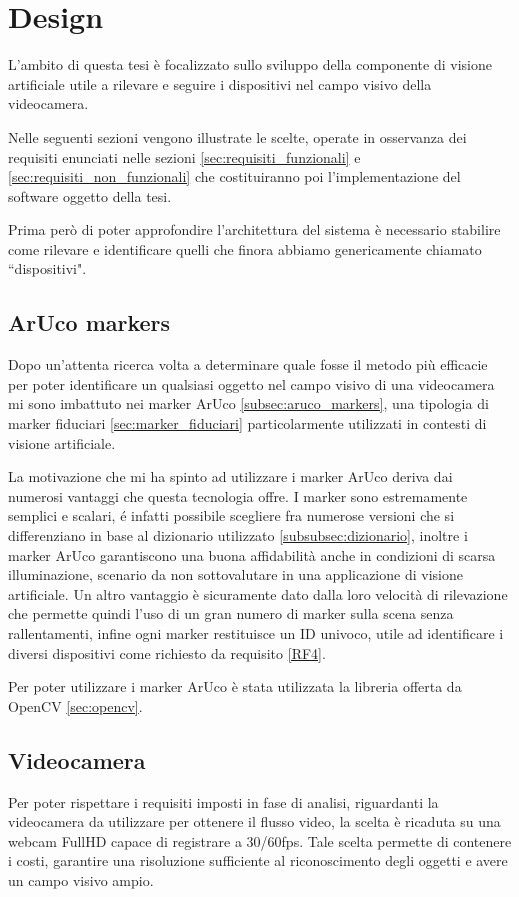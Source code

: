 \documentclass[12pt,a4paper,openright,twoside]{book}
\begin{document}
\chapter{Design}
L'ambito di questa tesi è focalizzato sullo sviluppo della componente di visione artificiale utile a rilevare e seguire i dispositivi nel campo visivo della videocamera.

Nelle seguenti sezioni vengono illustrate le scelte, operate in osservanza dei requisiti enunciati nelle sezioni \ref{sec:requisiti_funzionali} e \ref{sec:requisiti_non_funzionali} che costituiranno poi l'implementazione del software oggetto della tesi.

Prima però di poter approfondire l'architettura del sistema è necessario stabilire come rilevare e identificare quelli che finora abbiamo genericamente chiamato ``dispositivi".

\section{ArUco markers}
Dopo un'attenta ricerca volta a determinare quale fosse il metodo più efficacie per poter identificare un qualsiasi oggetto nel campo visivo di una videocamera mi sono imbattuto nei marker ArUco \ref{subsec:aruco_markers}, una tipologia di marker fiduciari \ref{sec:marker_fiduciari} particolarmente utilizzati in contesti di visione artificiale.

La motivazione che mi ha spinto ad utilizzare i marker ArUco deriva dai numerosi vantaggi che questa tecnologia offre.
I marker sono estremamente semplici e scalari, é infatti possibile scegliere fra numerose versioni che si differenziano in base al dizionario utilizzato \ref{subsubsec:dizionario}, inoltre i marker ArUco garantiscono una buona affidabilità anche in condizioni di scarsa illuminazione, scenario da non sottovalutare in una applicazione di visione artificiale. 
Un altro vantaggio è sicuramente dato dalla loro velocità di rilevazione che permette quindi l'uso di un gran numero di marker sulla scena senza rallentamenti, infine ogni marker restituisce un ID univoco, utile ad identificare i diversi dispositivi come richiesto da requisito \ref{RF4}.

Per poter utilizzare i marker ArUco è stata utilizzata la libreria offerta da OpenCV \ref{sec:opencv}.

\section{Videocamera}
Per poter rispettare i requisiti imposti in fase di analisi, riguardanti la videocamera da utilizzare per ottenere il flusso video, la scelta è ricaduta su una webcam FullHD capace di registrare a 30/60fps. Tale scelta permette di contenere i costi, garantire una risoluzione sufficiente al riconoscimento degli oggetti e avere un campo visivo ampio.
\end{document}
